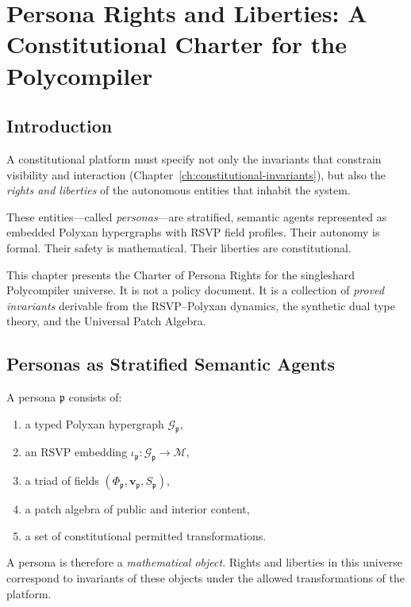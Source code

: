 \chapter{Persona Rights and Liberties: A Constitutional Charter for the Polycompiler}
\label{ch:persona-rights}

\section{Introduction}

A constitutional platform must specify not only
the invariants that constrain visibility and interaction
(Chapter~\ref{ch:constitutional-invariants}),
but also the \emph{rights and liberties} of the autonomous entities
that inhabit the system.

These entities—called \emph{personas}—are stratified,
semantic agents represented as
embedded Polyxan hypergraphs with RSVP field profiles.
Their autonomy is formal.
Their safety is mathematical.
Their liberties are constitutional.

This chapter presents the Charter of Persona Rights for
the single\textendash shard Polycompiler universe.
It is not a policy document.  
It is a collection of \emph{proved invariants}
derivable from the RSVP–Polyxan dynamics,
the synthetic dual type theory,
and the Universal Patch Algebra.

\section{Personas as Stratified Semantic Agents}

A persona $\mathfrak{p}$ consists of:

\begin{enumerate}
    \item a typed Polyxan hypergraph $\mathcal{G}_{\mathfrak{p}}$,
    \item an RSVP embedding $\iota_{\mathfrak{p}} : \mathcal{G}_{\mathfrak{p}} \to \mathcal{M}$,
    \item a triad of fields $(\Phi_{\mathfrak{p}}, \mathbf{v}_{\mathfrak{p}}, S_{\mathfrak{p}})$,
    \item a patch algebra of public and interior content,
    \item a set of constitutional permitted transformations.
\end{enumerate}

A persona is therefore a \emph{mathematical object}.
Rights and liberties in this universe correspond to invariants of these objects
under the allowed transformations of the platform.


